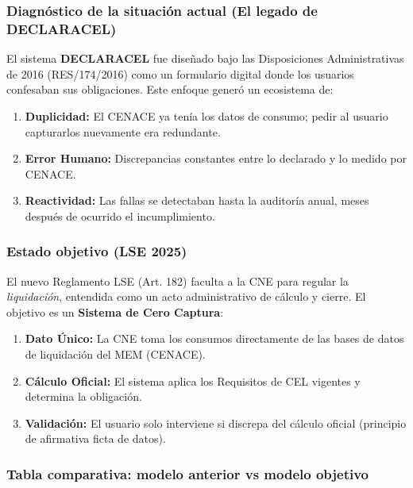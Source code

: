 \documentclass{cel}
\begin{document}
\subsubsection{Diagnóstico de la situación actual (El legado de DECLARACEL)}
\nopagebreak

El sistema \textbf{DECLARACEL} fue diseñado bajo las Disposiciones Administrativas de 2016 (RES/174/2016) como un formulario digital donde los usuarios \textquotedbl{}confesaban\textquotedbl{} sus obligaciones. Este enfoque generó un ecosistema de:


\begin{enumerate}
\item \textbf{Duplicidad:} El CENACE ya tenía los datos de consumo; pedir al usuario capturarlos nuevamente era redundante.
\item \textbf{Error Humano:} Discrepancias constantes entre lo \textquotedbl{}declarado\textquotedbl{} y lo \textquotedbl{}medido\textquotedbl{} por CENACE.
\item \textbf{Reactividad:} Las fallas se detectaban hasta la auditoría anual, meses después de ocurrido el incumplimiento.

\end{enumerate}
\subsubsection{Estado objetivo (LSE 2025)}
\nopagebreak

El nuevo Reglamento LSE (Art. 182) faculta a la CNE para regular la \textit{\textquotedbl{}liquidación\textquotedbl{}}, entendida como un acto administrativo de cálculo y cierre. El objetivo es un \textbf{Sistema de Cero Captura}:


\begin{enumerate}
\item \textbf{Dato Único:} La CNE toma los consumos directamente de las bases de datos de liquidación del MEM (CENACE).
\item \textbf{Cálculo Oficial:} El sistema aplica los Requisitos de CEL vigentes y determina la obligación.
\item \textbf{Validación:} El usuario solo interviene si discrepa del cálculo oficial (principio de \textquotedbl{}afirmativa ficta\textquotedbl{} de datos).

\end{enumerate}
\vspace{0.4cm}
\subsubsection{Tabla comparativa: modelo anterior vs modelo objetivo}
\nopagebreak
\end{document}
